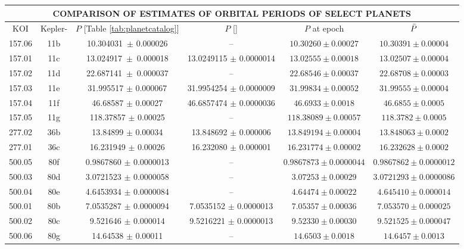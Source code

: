 \documentclass{aastex62}
\begin{document}
\begin{table}[]
    \centering
    \begin{tabular}{|c|c||c|c|c|c|}
        \multicolumn{6}{c}{\textbf{COMPARISON OF ESTIMATES OF ORBITAL PERIODS OF SELECT PLANETS}}\\
        \hline
        KOI & Kepler- & $P$ [Table \ref{tab:planetcatalog}] & $P$ [\citealt{Holczer:2016}] & $P$ at epoch & $\Bar{P}$\\
        \hline
        157.06 & 11b & 10.304031~$\pm$ 0.000026 & -- & $10.30260\pm0.00027$ & $10.30391\pm0.00004$\\
        157.01 & 11c & 13.024917~$\pm$~0.000018 & 13.0249115 $\pm$ 0.0000014 & $13.02555\pm0.00018$ & $13.02507\pm0.00004$\\
         157.02 & 11d & 22.687141~$\pm$~0.000037 & -- & $22.68546\pm0.00037$&$22.68708\pm0.00003$ \\
         157.03 & 11e & 31.995517 $\pm$ 0.000067 & 31.9954254 $\pm$ 0.0000009 &  $31.99834\pm0.00052$ & $31.99555\pm0.00004$  \\
        157.04 & 11f & 46.68587 $\pm$ 0.00027 & 46.6857474 $\pm$ 0.0000036 &  $46.6933\pm0.0018$ & $46.6855\pm0.0005$ \\
         157.05 & 11g & 118.37857 $\pm$ 0.00025 & -- &  $118.38089\pm0.00057 $ & $118.3782\pm0.0005$  \\
         277.02 & 36b & 13.84899 $\pm$ 0.00034 & 13.848692 $\pm$ 0.000006 & $13.849194\pm0.00004$ & 
         $13.848063\pm0.0002$
         \\
         277.01 & 36c & 16.231949 $\pm$ 0.00026 & 16.232080 $\pm$ 0.000001 & $16.231774\pm0.00002$ &
         $16.232628\pm0.0002$
         \\
         500.05 & 80f & 0.9867860 $\pm$ 0.0000013 & -- & $ 0.9867873 \pm 0.0000044 $  & $ 0.9867862  \pm  0.0000012 $ \\
         500.03 & 80d & 3.0721523 $\pm$ 0.0000058 & -- &  $ 3.07253 \pm 0.00029 $ & $ 3.0721293  \pm  0.0000086 $ \\
         500.04 & 80e & 4.6453934 $\pm$ 0.0000084 & -- &  $ 4.64474 \pm 0.00022 $ & $ 4.645410  \pm  0.000014 $  \\
         500.01 & 80b & 7.0535287 $\pm$ 0.0000094 & 7.0535152 $\pm$ 0.0000013&  $ 7.05357 \pm 0.00036 $ & $ 7.053570 \pm 0.000025 $   \\
         500.02 & 80c & 9.521646 $\pm$ 0.000014 & 9.5216221 $\pm$ 0.0000013 &  $ 9.52330 \pm 0.00030 $ & $ 9.521525  \pm  0.000047 $  \\
         500.06 & 80g & 14.64538 $\pm$ 0.00011 & -- &  $ 14.6503 \pm 0.0018 $ & $ 14.6457  \pm  0.0013 $  \\
         

\end{tabular}
\end{table}
\end{document}
